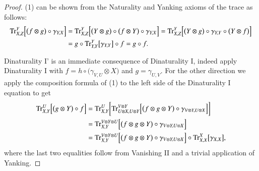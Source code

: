 \documentclass{amsart}
\def\tn{\textnormal}
\def\Trace{\tn{Tr}}
\theoremstyle{remark}
\theoremstyle{definition}
\begin{document}
\begin{proof}
 (1) can be shown from the Naturality and Yanking axioms of the trace as follows:
 \begin{align*}
  \Trace^Y_{X,Z}\Big[\big(f\otimes g\big)\circ\gamma_{Y,X}\Big]
  &=\Trace^Y_{X,Z}\Big[\big(Y\otimes g\big)\circ\big(f\otimes Y\big)\circ\gamma_{Y,X}\Big]=\Trace^Y_{X,Z}\Big[\big(Y\otimes g\big)\circ\gamma_{Y,Y}\circ\big(Y\otimes f\big)\Big]\\
  &=g\circ\Trace^Y_{Y,Y}\big[\gamma_{Y,Y}\big]\circ f=g\circ f.
 \end{align*}
 
 Dinaturality I' is an immediate consequence of Dinaturality I, indeed apply Dinaturality I with $f=h\circ\big(\gamma_{V,U}\otimes X\big)$ and $g=\gamma_{U,V}$.  For the other direction we apply the composition formula of (1) to the left side of the Dinaturality I equation to get
 \begin{align*}
  \Trace^U_{X,Y}\Big[\big(g\otimes Y\big)\circ f\Big]
  &=\Trace^U_{X,Y}\bigg[\Trace^{V\otimes Y}_{U\otimes X,U\otimes Y}\Big[\big(f\otimes g\otimes Y\big)\circ\gamma_{V\otimes Y,U\otimes X}\Big]\bigg]\\
 &=\Trace^{V\otimes Y\otimes U}_{X,Y}\Big[\big(f\otimes g\otimes Y\big)\circ\gamma_{V\otimes Y,U\otimes X}\Big]\\
  &=\Trace^{V\otimes Y\otimes U}_{X,Y}\Big[\big(f\otimes g\otimes Y\big)\circ\gamma_{V\otimes Y,U\otimes X}\Big]\circ\Trace^X_{X,X}\big[\gamma_{X,X}\big],
 \end{align*}
 where the last two equalities follow from Vanishing II and a trivial application of Yanking.  
 

\end{proof}
\end{document}
